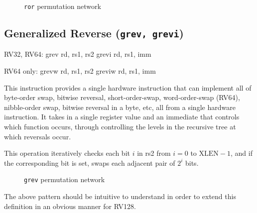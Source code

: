
\begin{figure}[t]
\begin{center}

\end{center}
\caption{\texttt{ror} permutation network}
\label{permnet-ror}
\end{figure}

\subsection{Generalized Reverse (\texttt{grev,\ grevi})}
\label{grev}

\begin{rvb}
  RV32, RV64:
    grev rd, rs1, rs2
    grevi rd, rs1, imm

  RV64 only:
    grevw rd, rs1, rs2
    greviw rd, rs1, imm
\end{rvb}

This instruction provides a single hardware instruction that can implement all
of byte-order swap, bitwise reversal, short-order-swap, word-order-swap
(RV64), nibble-order swap, bitwise reversal in a byte, etc, all from a single
hardware instruction. It takes in a single register value and an immediate that
controls which function occurs, through controlling the levels in the recursive
tree at which reversals occur.

This operation iteratively checks each bit $i$ in rs2 from $i=0$ to
$\textrm{XLEN}-1$, and if the corresponding bit is set, swaps each adjacent
pair of $2^i$ bits.

\begin{figure}[t]
\begin{center}

\end{center}
\caption{\texttt{grev} permutation network}
\label{permnet-grev}
\end{figure}



The above pattern should be intuitive to understand in order to extend
this definition in an obvious manner for RV128.

